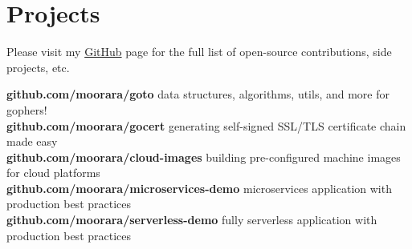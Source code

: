 \documentclass[]{cv-style}                     %
\begin{document}

\section{Projects}

Please visit my \href{http://github.com/moorara}{GitHub} page for the full list of open-source contributions, side projects, etc.

\textbf{github.com/moorara/goto} data structures, algorithms, utils, and more for gophers! \\
\textbf{github.com/moorara/gocert} generating self-signed SSL/TLS certificate chain made easy \\
\textbf{github.com/moorara/cloud-images} building pre-configured machine images for cloud platforms \\
\textbf{github.com/moorara/microservices-demo} microservices application with production best practices  \\
\textbf{github.com/moorara/serverless-demo} fully serverless application with production best practices  \\

\begin{entrylist}




\end{entrylist}
\end{document}

